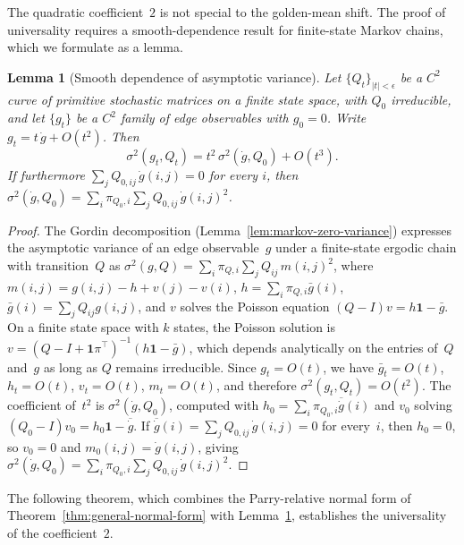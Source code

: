 \documentclass[pdflatex,sn-basic,Numbered]{sn-jnl}
\theoremstyle{thmstyleone}
\newtheorem{lemma}[theorem]{Lemma}
\theoremstyle{thmstyletwo}
\theoremstyle{thmstylethree}
\begin{document}
The quadratic coefficient~$2$ is not special to the golden-mean shift. The proof of universality requires a smooth-dependence result for finite-state Markov chains, which we formulate as a lemma.

\begin{lemma}[Smooth dependence of asymptotic variance]\label{lem:smooth-variance}
Let $\{Q_t\}_{|t|<\epsilon}$ be a $C^2$ curve of primitive stochastic matrices on a finite state space, with $Q_0$ irreducible, and let $\{g_t\}$ be a $C^2$ family of edge observables with $g_0=0$. Write $g_t=t\,\dot{g}+O(t^2)$. Then
\[
\sigma^2(g_t,Q_t)=t^2\,\sigma^2(\dot{g},Q_0)+O(t^3).
\]
If furthermore $\sum_jQ_{0,ij}\,\dot{g}(i,j)=0$ for every $i$, then $\sigma^2(\dot{g},Q_0)=\sum_i\pi_{Q_0,i}\sum_jQ_{0,ij}\,\dot{g}(i,j)^2$.
\end{lemma}

\begin{proof}
The Gordin decomposition (Lemma~\ref{lem:markov-zero-variance}) expresses the asymptotic variance of an edge observable~$g$ under a finite-state ergodic chain with transition~$Q$ as $\sigma^2(g,Q)=\sum_i\pi_{Q,i}\sum_jQ_{ij}\,m(i,j)^2$, where $m(i,j)=g(i,j)-h+v(j)-v(i)$, $h=\sum_i\pi_{Q,i}\bar{g}(i)$, $\bar{g}(i)=\sum_jQ_{ij}g(i,j)$, and $v$ solves the Poisson equation $(Q-I)v=h\mathbf{1}-\bar{g}$. On a finite state space with $k$ states, the Poisson solution is $v=(Q-I+\mathbf{1}\pi^\top)^{-1}(h\mathbf{1}-\bar{g})$, which depends analytically on the entries of~$Q$ and~$g$ as long as $Q$ remains irreducible. Since $g_t=O(t)$, we have $\bar{g}_t=O(t)$, $h_t=O(t)$, $v_t=O(t)$, $m_t=O(t)$, and therefore $\sigma^2(g_t,Q_t)=O(t^2)$. The coefficient of~$t^2$ is $\sigma^2(\dot{g},Q_0)$, computed with $h_0=\sum_i\pi_{Q_0,i}\overline{\dot{g}}(i)$ and $v_0$ solving $(Q_0-I)v_0=h_0\mathbf{1}-\overline{\dot{g}}$. If $\overline{\dot{g}}(i)=\sum_jQ_{0,ij}\,\dot{g}(i,j)=0$ for every~$i$, then $h_0=0$, so $v_0=0$ and $m_0(i,j)=\dot{g}(i,j)$, giving $\sigma^2(\dot{g},Q_0)=\sum_i\pi_{Q_0,i}\sum_jQ_{0,ij}\,\dot{g}(i,j)^2$.
\end{proof}

The following theorem, which combines the Parry-relative normal form of Theorem~\ref{thm:general-normal-form} with Lemma~\ref{lem:smooth-variance}, establishes the universality of the coefficient~$2$.
\end{document}
